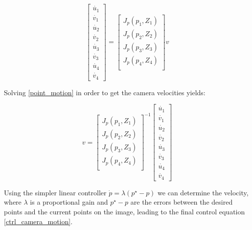 \documentclass[conference]{IEEEtran}
\begin{document}
\begin{equation}
\left[ \begin{matrix}
    \dot{u_{1}} \\ \dot{v_{1}} \\ \dot{u_{2}} \\ \dot{v_{2}} \\ \dot{u_{3}} \\ \dot{v_{3}} \\ \dot{u_{4}} \\ \dot{v_{4}} \end{matrix}  \right] = \left[ \begin{matrix} J_{p}(p_{1},Z_{1}) \\ J_{p}(p_{2},Z_{2}) \\ J_{p}(p_{3},Z_{3}) \\ J_{p}(p_{4},Z_{4}) \\ \end{matrix} \right] v \label{point_motion}
\end{equation}

Solving \eqref{point_motion} in order to get the camera velocities yields:

\begin{equation}
v = \left[ \begin{matrix} J_{p}(p_{1},Z_{1}) \\ J_{p}(p_{2},Z_{2}) \\ J_{p}(p_{3},Z_{3}) \\ J_{p}(p_{4},Z_{4}) \\ \end{matrix} \right]^{-1} \left[ \begin{matrix}
\dot{u_{1}} \\ \dot{v_{1}} \\ \dot{u_{2}} \\ \dot{v_{2}} \\ \dot{u_{3}} \\ \dot{v_{3}} \\ \dot{u_{4}} \\ \dot{v_{4}} \end{matrix}  \right] \label{camera_motion}
\end{equation}

Using the simpler linear controller $\dot{p} = \lambda(p^{\star} - p)$ we can determine the velocity, where $\lambda$ is a proportional gain and $p^{\star} - p$ are the errors between the desired points and the current points on the image, leading to the final control equation \eqref{ctrl_camera_motion}.
\end{document}
